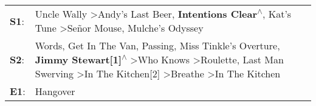 \begin{supertabular}{p{0.03\textwidth}p{0.92\textwidth}}
 \textbf{S1}:  &                                                                                                                                                                                                                                               Uncle Wally\textsuperscript{} \textgreater \enspace Andy's Last Beer\textsuperscript{}, \enspace \textbf{Intentions Clear\textsuperscript{$\wedge$}}, \enspace Kat's Tune\textsuperscript{} \textgreater \enspace Señor Mouse\textsuperscript{}, \enspace Mulche's Odyssey\textsuperscript{}  \enspace  \\
 \textbf{S2}:  &  Words\textsuperscript{}, \enspace Get In The Van\textsuperscript{}, \enspace Passing\textsuperscript{}, \enspace Miss Tinkle's Overture\textsuperscript{}, \enspace \textbf{Jimmy Stewart[1]\textsuperscript{$\wedge$}} \textgreater \enspace Who Knows\textsuperscript{} \textgreater \enspace Roulette\textsuperscript{}, \enspace Last Man Swerving\textsuperscript{} \textgreater \enspace In The Kitchen[2]\textsuperscript{} \textgreater \enspace Breathe\textsuperscript{} \textgreater \enspace In The Kitchen\textsuperscript{}  \enspace  \\
 \textbf{E1}:  &                                                                                                                                                                                                                                                                                                                                                                                                                                                                                                                 Hangover\textsuperscript{}  \enspace  \\
\end{supertabular}

